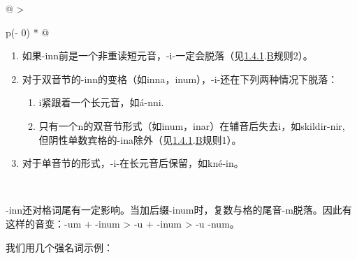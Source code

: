 \begin{longtable}[]{@{}
  >{\raggedright\arraybackslash}p{(\columnwidth - 0\tabcolsep) * }@{}}
\toprule\noalign{}
\begin{minipage}[b]{\linewidth}\raggedright
\begin{enumerate}
\def\labelenumi{\arabic{enumi})}
\item
  如果-inn前是一个非重读短元音，-i-一定会脱落（见\hyperref[ux5143ux97f3ux7684ux97f3ux53d8]{1.4.1}.\hyperref[_Ref115693879]{B}规则2）。
\item
  对于双音节的-inn的变格（如inna，inum），-i-还在下列两种情况下脱落：

  \begin{enumerate}
  \def\labelenumii{\roman{enumii}.}
  \item
    i紧跟着一个长元音，如á-nni.
  \item
    只有一个n的双音节形式（如inum，inar）在辅音后失去i，如skildir-nir,
    但阴性单数宾格的-ina除外（见\hyperref[ux5143ux97f3ux7684ux97f3ux53d8]{1.4.1}.\hyperref[_Ref115693879]{B}规则1）。
  \end{enumerate}
\item
  对于单音节的形式，-i-在长元音后保留，如kné-in。
\end{enumerate}
\end{minipage} \\
\midrule\noalign{}
\endhead
\bottomrule\noalign{}
\endlastfoot
\end{longtable}

-inn还对格词尾有一定影响。当加后缀-inum时，复数与格的尾音-m脱落。因此有这样的音变：-um
+ -inum \textgreater{} -u + -inum \textgreater{} -u -num。

我们用几个强名词示例：

